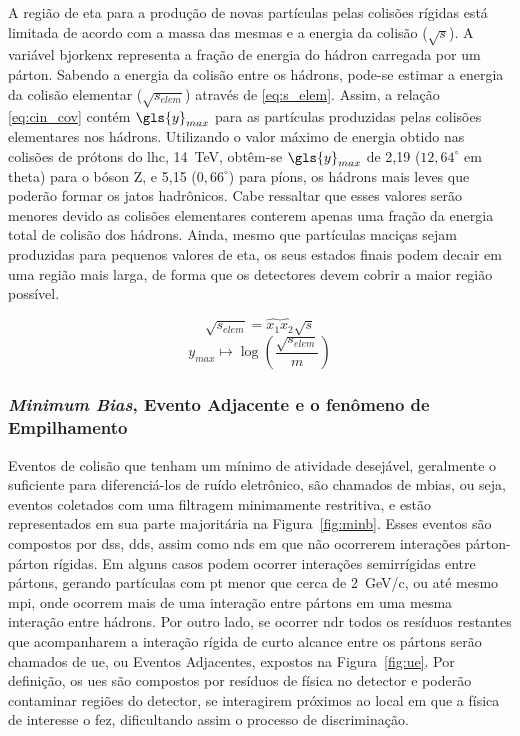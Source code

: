 A região de \gls{eta} para a produção de novas partículas pelas colisões
rígidas está limitada de acordo com a \gls{massa} das mesmas
e a energia da colisão ($\sqrt{s}$). A variável \gls{bjorkenx} representa a
fração de energia do hádron carregada por um párton. Sabendo a energia da colisão entre os
hádrons, pode-se estimar a energia da colisão elementar ($\sqrt{s_{elem}}$)
através de \ref{eq:s_elem}. Assim, a relação \ref{eq:cin_cov} contém $\gls{y}_{max}$
para as partículas produzidas pelas colisões elementares nos hádrons.
Utilizando o valor máximo de energia obtido nas colisões de prótons do \gls{lhc}, 14~TeV, 
obtêm-se $\gls{y}_{max}$ de 2,19 ($12,64^{\circ}$ em \gls{theta}) para o bóson Z, 
e 5,15 ($0,66^{\circ}$) para píons, os hádrons mais leves que poderão formar os
jatos hadrônicos. Cabe ressaltar que esses valores serão menores devido as
colisões elementares conterem apenas uma fração da energia total 
de colisão dos hádrons. Ainda, mesmo que partículas maciças sejam produzidas
para pequenos valores de \gls{eta}, os seus estados finais podem decair em uma
região mais larga, de forma que os detectores devem cobrir a maior região
possível.

\begin{equation}\label{eq:s_elem}
\sqrt{s_{elem}} = \hat{x_1} \hat{x_2} \sqrt{s}
\end{equation}
\begin{equation}\label{eq:cin_cov}
y_{max} \longmapsto \log\left( \frac{\sqrt{s_{elem}}}{m}\right)
\end{equation}


\subsubsection{\emph{Minimum Bias}, Evento Adjacente e o fenômeno de Empilhamento}
\label{sssec:minb_ue_pileup}

Eventos de colisão que tenham um mínimo de atividade desejável,
geralmente o suficiente para diferenciá-los de ruído eletrônico, 
são chamados de \gls{mbias}, ou
seja, eventos coletados com uma filtragem minimamente restritiva, e estão
representados em sua parte majoritária na Figura~\ref{fig:minb}. Esses
eventos são compostos por \glspl{ds}, \glspl{dd}, assim como \glspl{nd} em
que não ocorrerem interações párton-párton rígidas. Em alguns casos podem
ocorrer interações semirrígidas entre pártons, gerando partículas com \gls{pt}
menor que cerca de 2~GeV/c, ou até mesmo \gls{mpi}, onde ocorrem mais de uma
interação entre pártons em uma mesma interação entre hádrons. 
Por outro lado, se ocorrer \gls{ndr} 
todos os resíduos restantes que acompanharem a interação rígida de curto alcance
entre os pártons serão chamados de \gls{ue}, ou Eventos Adjacentes, expostos na
Figura~\ref{fig:ue}.
Por definição, os \glspl{ue} são compostos por resíduos de física no
detector e poderão contaminar regiões do detector, se interagirem próximos 
ao local em que a física de interesse o fez, dificultando assim o
processo de discriminação.

